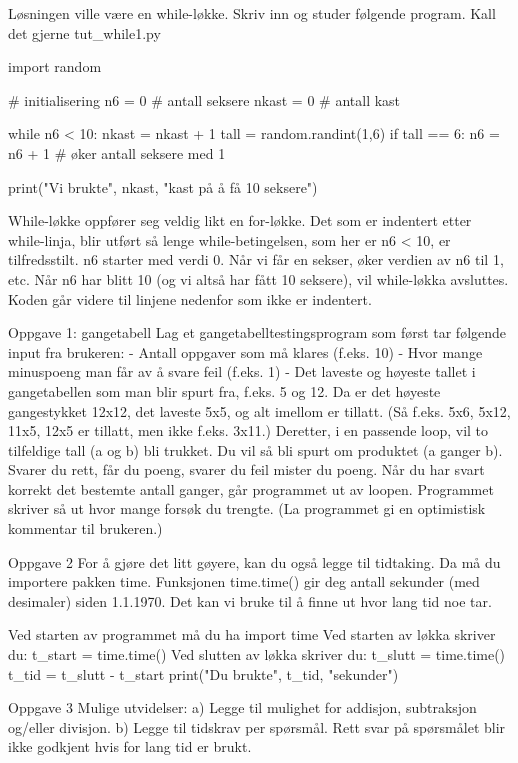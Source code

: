 {Løsningen ville være en while-løkke.
Skriv inn og studer følgende program. Kall det gjerne tut_while1.py

import random

# initialisering
n6    = 0  # antall seksere
nkast = 0  # antall kast

while n6 < 10: 
    nkast = nkast + 1
    tall = random.randint(1,6)
    if tall == 6:
       n6 = n6 + 1    # øker antall seksere med 1
    
print("Vi brukte", nkast, "kast på å få 10 seksere")

While-løkke oppfører seg veldig likt en for-løkke. 
Det som er indentert etter while-linja, blir utført så lenge while-betingelsen,
som her er n6 < 10, er tilfredsstilt.
n6 starter med verdi 0.
Når vi får en sekser, øker verdien av n6 til 1, etc.
Når n6 har blitt 10 (og vi altså har fått 10 seksere), vil while-løkka avsluttes.
Koden går videre til linjene nedenfor som ikke er indentert. 




Oppgave 1: gangetabell
Lag et gangetabelltestingsprogram som først tar følgende input fra brukeren:
- Antall oppgaver som må klares (f.eks. 10)
- Hvor mange minuspoeng man får av å svare feil (f.eks. 1)
- Det laveste og høyeste tallet i gangetabellen som man blir spurt fra, f.eks. 5 og 12.
Da er det høyeste gangestykket 12x12, det laveste 5x5, og alt imellom er tillatt.
(Så f.eks. 5x6, 5x12, 11x5, 12x5 er tillatt, men ikke f.eks. 3x11.) 
Deretter, i en passende loop, vil to tilfeldige tall (a og b) bli trukket.
Du vil så bli spurt om produktet (a ganger b).
Svarer du rett, får du poeng, svarer du feil mister du poeng.
Når du har svart korrekt det bestemte antall ganger, går programmet ut av loopen. 
Programmet skriver så ut hvor mange forsøk du trengte.
(La programmet gi en optimistisk kommentar til brukeren.) 


Oppgave 2
For å gjøre det litt gøyere, kan du også legge til tidtaking. 
Da må du importere pakken time.
Funksjonen time.time() gir deg antall sekunder (med desimaler) siden 1.1.1970.
Det kan vi bruke til å finne ut hvor lang tid noe tar.

Ved starten av programmet må du ha
import time
Ved starten av løkka skriver du: 
t_start = time.time()
Ved slutten av løkka skriver du: 
t_slutt = time.time()
t_tid = t_slutt - t_start
print("Du brukte", t_tid, "sekunder")


Oppgave 3
Mulige utvidelser:
a) Legge til mulighet for addisjon, subtraksjon og/eller divisjon. 
b) Legge til tidskrav per spørsmål.
Rett svar på spørsmålet blir ikke godkjent hvis for lang tid er brukt. 


}
